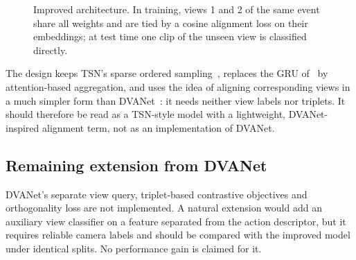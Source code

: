 \documentclass[runningheads]{llncs}
\begin{document}
\begin{figure}[tb]
\centering
{}
\caption{Improved architecture. In training, views 1 and 2 of the same event share all weights and are tied by a cosine alignment loss on their embeddings; at test time one clip of the unseen view is classified directly.}
\label{fig:improved}
\end{figure}

The design keeps TSN's sparse ordered sampling~\cite{tsn}, replaces the GRU of~\cite{bui} by attention-based aggregation, and uses the idea of aligning corresponding views in a much simpler form than DVANet~\cite{dva}: it needs neither view labels nor triplets. It should therefore be read as a TSN-style model with a lightweight, DVANet-inspired alignment term, not as an implementation of DVANet.

\subsection{Remaining extension from DVANet}
DVANet's separate view query, triplet-based contrastive objectives and orthogonality loss are not implemented. A natural extension would add an auxiliary view classifier on a feature separated from the action descriptor, but it requires reliable camera labels and should be compared with the improved model under identical splits. No performance gain is claimed for it.
\end{document}
